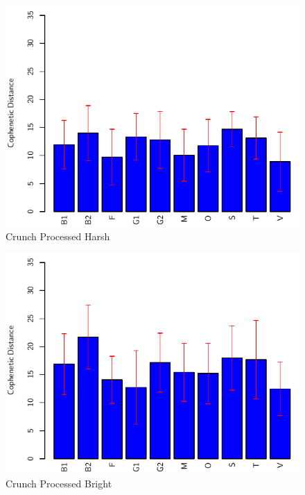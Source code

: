 		\begin{figure}[h!]
			\centering
			\includegraphics{chapter7/Images/HarshDifferenceHarshBar.pdf}
			\caption{Crunch Processed Harsh}
		\end{figure}

		\begin{figure}[h!]
			\centering
			\includegraphics{chapter7/Images/CrunchProcessedBrightBar.pdf}
			\caption{Crunch Processed Bright}
		\end{figure}

